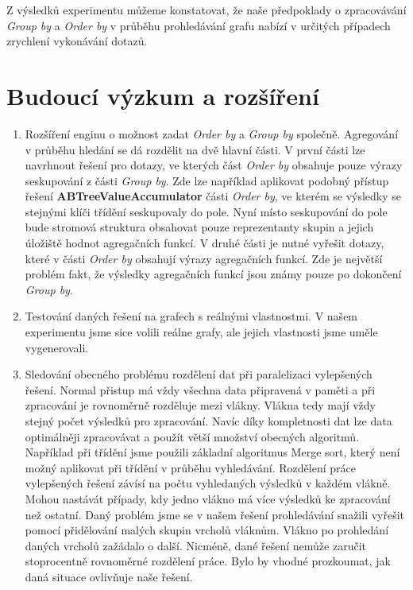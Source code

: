 Z výsledků experimentu můžeme konstatovat, že naše předpoklady o zpracovávání \textit{Group by} a \textit{Order by} v průběhu prohledávání grafu nabízí v určitých případech zrychlení vykonávání dotazů.

\section*{Budoucí výzkum a rozšíření}

\begin{enumerate}

\item 
Rozšíření enginu o možnost zadat \textit{Order by} a \textit{Group by} společně.
Agregování v průběhu hledání se dá rozdělit na dvě hlavní části.
V první části lze navrhnout řešení pro dotazy, ve kterých část \textit{Order by} obsahuje pouze výrazy seskupování z části \textit{Group by}.
Zde lze například aplikovat podobný přístup řešení \textbf{ABTreeValueAccumulator} části \textit{Order by}, ve kterém se výsledky se stejnými klíči třídění seskupovaly do pole.
Nyní místo seskupování do pole bude stromová struktura obsahovat pouze reprezentanty skupin a jejich úložiště hodnot agregačních funkcí.
V druhé části je nutné vyřešit dotazy, které v části \textit{Order by} obsahují výrazy agregačních funkcí.
Zde je největší problém fakt, že výsledky agregačních funkcí jsou známy pouze po dokončení \textit{Group by}.

\item Testování daných řešení na grafech s reálnými vlastnostmi.
V našem experimentu jsme sice volili reálne grafy, ale jejich vlastnosti jsme uměle vygenerovali.

\item Sledování obecného problému rozdělení dat při paralelizaci vylepšených řešení. 
Normal přistup má vždy všechna data připravená v paměti a při zpracování je rovnoměrně rozděluje mezi vlákny.
Vlákna tedy mají vždy stejný počet výsledků pro zpracování.
Navíc díky kompletnosti dat lze data optimálněji zpracovávat a použít větší množství obecných algoritmů.
Například při třídění jsme použili základní algoritmus Merge sort, který není možný aplikovat při třídění v průběhu vyhledávání.  
Rozdělení práce vylepšených řešení závísí na počtu vyhledaných výsledků v každém vlákně.
Mohou nastávát případy, kdy jedno vlákno má více výsledků ke zpracování než ostatní. 
Daný problém jsme se v našem řešení prohledávání snažili vyřešit pomocí přidělování malých skupin vrcholů vláknům.
Vlákno po prohledání daných vrcholů zažádalo o další.
Nicméně, dané řešení nemůže zaručit stoprocentně rovnoměrné rozdělení práce.
Bylo by vhodné prozkoumat, jak daná situace ovlivňuje naše řešení.


\end{enumerate}
